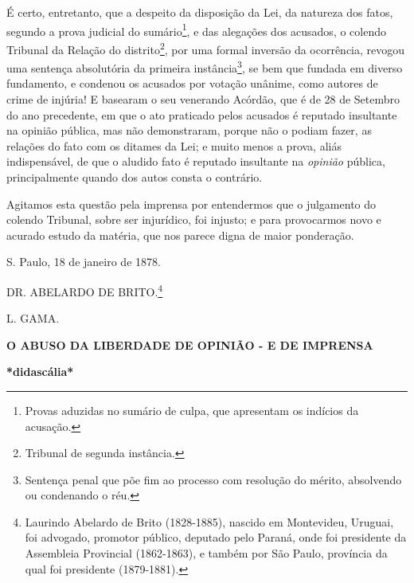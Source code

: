 É certo, entretanto, que a despeito da disposição da Lei, da natureza
dos fatos, segundo a prova judicial do sumário\footnote{Provas aduzidas
  no sumário de culpa, que apresentam os indícios da acusação.}, e das
alegações dos acusados, o colendo Tribunal da Relação do
distrito\footnote{Tribunal de segunda instância.}, por uma formal
inversão da ocorrência, revogou uma sentença absolutória da primeira
instância\footnote{Sentença penal que põe fim ao processo com resolução
  do mérito, absolvendo ou condenando o réu.}, se bem que fundada em
diverso fundamento, e condenou os acusados por votação unânime, como
autores de crime de injúria! E basearam o seu venerando Acórdão, que é
de 28 de Setembro do ano precedente, em que o ato praticado pelos
acusados é reputado insultante na opinião pública, mas não demonstraram,
porque não o podiam fazer, as relações do fato com os ditames da Lei; e
muito menos a prova, aliás indispensável, de que o aludido fato é
reputado insultante na \emph{opinião} pública, principalmente quando dos
autos consta o contrário.

Agitamos esta questão pela imprensa por entendermos que o julgamento do
colendo Tribunal, sobre ser injurídico, foi injusto; e para provocarmos
novo e acurado estudo da matéria, que nos parece digna de maior
ponderação.

S. Paulo, 18 de janeiro de 1878.

DR. ABELARDO DE BRITO.\footnote{Laurindo Abelardo de Brito (1828-1885),
  nascido em Montevideu, Uruguai, foi advogado, promotor público,
  deputado pelo Paraná, onde foi presidente da Assembleia Provincial
  (1862-1863), e também por São Paulo, província da qual foi presidente
  (1879-1881).}

L. GAMA.

\textbf{O ABUSO DA LIBERDADE DE OPINIÃO - E DE IMPRENSA}

\textbf{*didascália*}

